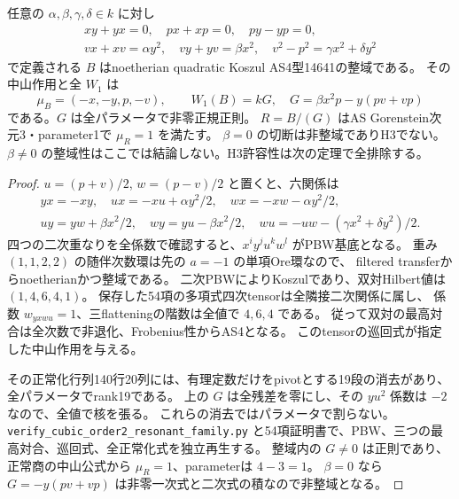 \begin{theorem}[共鳴する四パラメータ正規三次候補族]
\label{thm:h3-order2-resonant-family}
任意の $\alpha,\beta,\gamma,\delta\in k$ に対し
\[
\begin{gathered}
 xy+yx=0,\quad px+xp=0,\quad py-yp=0,\\
 vx+xv=\alpha y^2,\quad vy+yv=\beta x^2,\quad
 v^2-p^2=\gamma x^2+\delta y^2
\end{gathered}
\]
で定義される $B$ はnoetherian quadratic Koszul AS4型14641の整域である。
その中山作用と全 $W_1$ は
\[
 \mu_B=(-x,-y,p,-v),\qquad
 W_1(B)=kG,\quad G=\beta x^2p-y(pv+vp)
\]
である。$G$ は全パラメータで非零正規正則。
$R=B/(G)$ はAS Gorenstein次元3・parameter1で $\mu_R=1$ を満たす。
$\beta=0$ の切断は非整域でありH3でない。
$\beta\ne0$ の整域性はここでは結論しない。H3許容性は次の定理で全排除する。
\end{theorem}
\begin{proof}
$u=(p+v)/2$, $w=(p-v)/2$ と置くと、六関係は
\[
\begin{gathered}
 yx=-xy,\quad ux=-xu+\alpha y^2/2,\quad
 wx=-xw-\alpha y^2/2,\\
 uy=yw+\beta x^2/2,\quad wy=yu-\beta x^2/2,\quad
 wu=-uw-(\gamma x^2+\delta y^2)/2.
\end{gathered}
\]
四つの二次重なりを全係数で確認すると、$x^iy^ju^kw^l$ がPBW基底となる。
重み $(1,1,2,2)$ の随伴次数環は先の $a=-1$ の単項Ore環なので、
filtered transferからnoetherianかつ整域である。
二次PBWによりKoszulであり、双対Hilbert値は $(1,4,6,4,1)$。
保存した54項の多項式四次tensorは全隣接二次関係に属し、
係数 $w_{yxwu}=1$、三flatteningの階数は全値で $4,6,4$ である。
従って双対の最高対合は全次数で非退化、Frobenius性からAS4となる。
このtensorの巡回式が指定した中山作用を与える。

その正常化行列140行20列には、有理定数だけをpivotとする19段の消去があり、
全パラメータでrank19である。
上の $G$ は全残差を零にし、その $yu^2$ 係数は $-2$ なので、全値で核を張る。
これらの消去ではパラメータで割らない。
\texttt{verify\_\allowbreak{}cubic\_\allowbreak{}order2\_\allowbreak{}resonant\_\allowbreak{}family.py}
と54項証明書で、PBW、三つの最高対合、巡回式、全正常化式を独立再生する。
整域内の $G\ne0$ は正則であり、正常商の中山公式から $\mu_R=1$、parameterは $4-3=1$。
$\beta=0$ なら $G=-y(pv+vp)$ は非零一次式と二次式の積なので非整域となる。
\end{proof}

